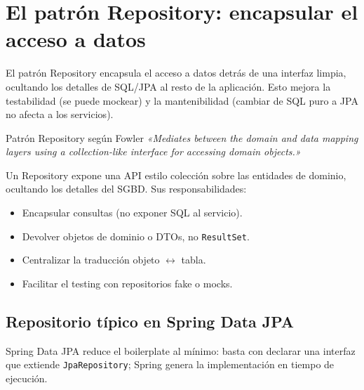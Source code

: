 \documentclass[11pt,a4paper,openany]{book}
\begin{document}
\section{El patrón Repository: encapsular el acceso a datos}

El patrón Repository encapsula el acceso a datos detrás de
una interfaz limpia, ocultando los detalles de SQL/JPA al resto de
la aplicación. Esto mejora la testabilidad (se puede mockear) y la
mantenibilidad (cambiar de SQL puro a JPA no afecta a los servicios).


\begin{cajadefinicion}{Patrón Repository según Fowler}
\emph{«Mediates between the domain and data mapping layers using a
collection-like interface for accessing domain objects.»}
\cite{fowler2002patterns}

Un Repository expone una API estilo colección sobre las entidades de
dominio, ocultando los detalles del SGBD. Sus responsabilidades:
\begin{itemize}
\item Encapsular consultas (no exponer SQL al servicio).
\item Devolver objetos de dominio o DTOs, no \texttt{ResultSet}.
\item Centralizar la traducción objeto $\leftrightarrow$ tabla.
\item Facilitar el testing con repositorios fake o mocks.
\end{itemize}
\end{cajadefinicion}

\subsection{Repositorio típico en Spring Data JPA}

Spring Data JPA reduce el boilerplate al mínimo: basta con declarar
una interfaz que extiende \texttt{JpaRepository}; Spring genera la
implementación en tiempo de ejecución.
\end{document}
